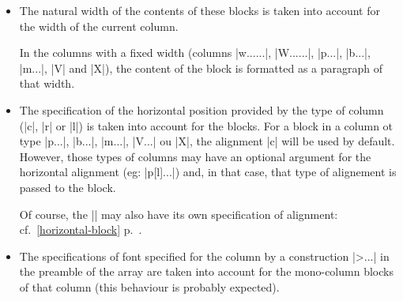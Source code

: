 \documentclass[dvipsnames]{article}%
\begin{document}
\begin{itemize}
\item The natural width of the contents of these blocks is taken into account
for the width of the current column.

In the columns with a fixed width (columns |w{...}{...}|, |W{...}{...}|,
|p{...}|, |b{...}|, |m{...}|, |V| and |X|), the content of the block is
formatted as a paragraph of that width.

\item The specification of the horizontal position provided by the type of
column (|c|, |r| or |l|) is taken into account for the blocks. For a block in a
column ot type |p{...}|, |b{...}|, |m{...}|, |V{...}| ou |X|, the alignment |c|
will be used by default. However, those types of columns may have an optional
argument for the horizontal alignment (eg: |p[l]{...}|) and, in that case, that
type of alignement is passed to the block.

Of course, the |\Block| may also have its own specification of alignment:
cf.~\ref{horizontal-block} p.~\pageref{horizontal-block}.

\item The specifications of font specified for the column by a construction
|>{...}| in the preamble of the array are taken into account for the
mono-column blocks of that column (this behaviour is probably expected).
\end{itemize}
\end{document}
